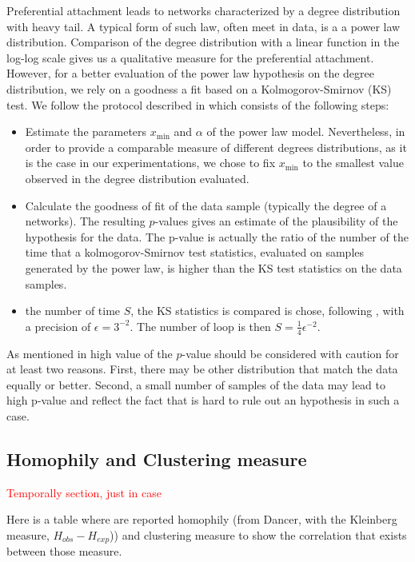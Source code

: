 \documentclass[a4paper, 12pt]{article}
\begin{document}
\label{sec:experiments-burst}
Preferential attachment leads to networks characterized by a degree distribution with heavy tail. A typical form of such law, often meet in data, is a a power law distribution. Comparison of the degree distribution with a linear function in the log-log scale  gives us a qualitative measure for the preferential attachment. However, for a better evaluation of the power law hypothesis on the degree distribution, we rely on a  goodness a fit based on a Kolmogorov-Smirnov (KS) test. We follow the protocol described in \cite{clauset2009power} which consists of the following steps:
\begin{itemize}
	\item Estimate the parameters $x_\text{min}$ and $\alpha$ of the power law model. Nevertheless, in order to provide a comparable measure of different degrees distributions, as it is the case in our experimentations, we chose to fix $x_\text{min}$  to the smallest value observed in the degree distribution evaluated.
	\item Calculate the goodness of fit of the data sample (typically the degree of a networks). The resulting $p$-values gives an estimate of the  plausibility of the hypothesis for the data. The p-value is actually the ratio of the number of the time that a kolmogorov-Smirnov test statistics, evaluated on samples generated by the power law, is higher than the KS test statistics on the data samples. 
    \item the number of time $S$, the KS statistics is compared is chose, following \cite{clauset2009power}, with a precision of $\epsilon = 3^{-2}$. The  number of loop is then $S = \frac{1}{4}\epsilon^{-2}$.
\end{itemize}

As mentioned in \cite{clauset2009power} high value of the $p$-value should be considered with caution for at least two reasons. First, there may be other distribution that match the data equally or better. Second, a small number of samples of the data may lead to high p-value and reflect the fact that is hard to rule out an hypothesis in such a case.

\subsection{Homophily and Clustering measure}
\textcolor{red}{Temporally section, just in case}

Here is a  table where are reported homophily (from Dancer, with the Kleinberg measure, $H_{obs} - H_{exp}$)) and clustering measure to show the correlation that exists between those measure. 
\end{document}
